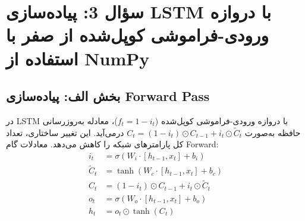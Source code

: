 \documentclass[12pt,a4paper]{article}
\begin{document}
	
	\section{سؤال 3: پیاده‌سازی LSTM با دروازه ورودی-فراموشی کوپل‌شده از صفر با استفاده از NumPy}
	
	\subsection{بخش الف: پیاده‌سازی Forward Pass}
	
	\begin{tcolorbox}[colback=lightblue,colframe=mainblue,title=\textbf{شرح معماری}]
		در LSTM با دروازه ورودی-فراموشی کوپل‌شده ($f_t = 1 - i_t$)، معادله به‌روزرسانی حافظه به‌صورت $C_t = (1 - i_t) \odot C_{t-1} + i_t \odot \tilde{C}_t$ درمی‌آید. این تغییر ساختاری، تعداد کل پارامترهای شبکه را کاهش می‌دهد. معادلات گام Forward:
		\begin{align*}
			i_t &= \sigma(W_i \cdot [h_{t-1}, x_t] + b_i) \\
			\tilde{C}_t &= \tanh(W_c \cdot [h_{t-1}, x_t] + b_c) \\
			C_t &= (1 - i_t) \odot C_{t-1} + i_t \odot \tilde{C}_t \\
			o_t &= \sigma(W_o \cdot [h_{t-1}, x_t] + b_o) \\
			h_t &= o_t \odot \tanh(C_t)
		\end{align*}
	\end{tcolorbox}
	
\end{document}
